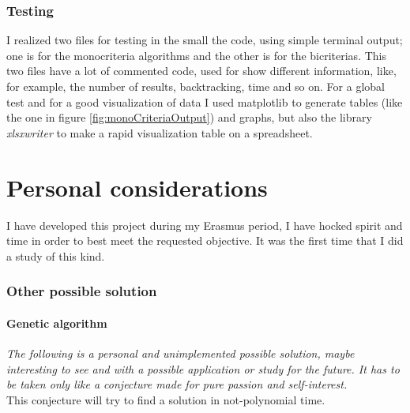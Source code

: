\documentclass[a4paper,11pt]{report}
\begin{document}
\subsection{Testing}
I realized two files for testing in the small the code, using simple terminal output; one is for the monocriteria algorithms and the other is for the bicriterias. This two files have a lot of commented code, used for show different information, like, for example, the number of results, backtracking, time and so on. For a global test and for a good visualization of data I used matplotlib to generate tables (like the one in figure \ref{fig:monoCriteriaOutput}) and graphs, but also the library \textit{xlsxwriter} to make a rapid visualization table on a spreadsheet.
\chapter{Personal considerations}
I have developed this project during my Erasmus period, I have hocked spirit and time in order to best meet the requested objective. It was the first time that I did a study of this kind.
\subsection{Other possible solution}
\subsubsection*{Genetic algorithm}
\textit{The following is a personal and unimplemented possible solution, maybe interesting to see and with a possible application or study for the future.
It has to be taken only like a conjecture made for pure passion and self-interest.}
\vspace{10mm}\\
This conjecture will try to find a solution in not-polynomial time.
\end{document}
